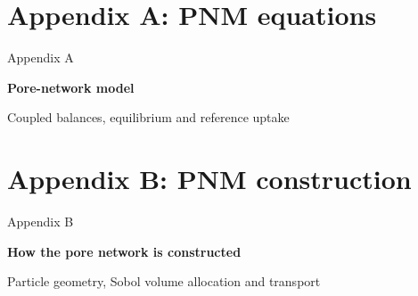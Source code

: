 \ifdefined\poreaccessappendixstarted\else\appendix{}\fi
\section[PNM equations]{Appendix A: PNM equations}
\begin{frame}{}
\vfill
{\large\color{tumgray}Appendix A}\par\vspace{0.4cm}
{\LARGE\color{tumblue}\textbf{Pore-network model}}\par\vspace{0.5cm}
{\large Coupled balances, equilibrium and reference uptake}
\vfill
\end{frame}



\section[PNM construction]{Appendix B: PNM construction}
\begin{frame}{}
\vfill
{\large\color{tumgray}Appendix B}\par\vspace{0.4cm}
{\LARGE\color{tumblue}\textbf{How the pore network is constructed}}\par\vspace{0.5cm}
{\large Particle geometry, Sobol volume allocation and transport}
\vfill
\end{frame}

